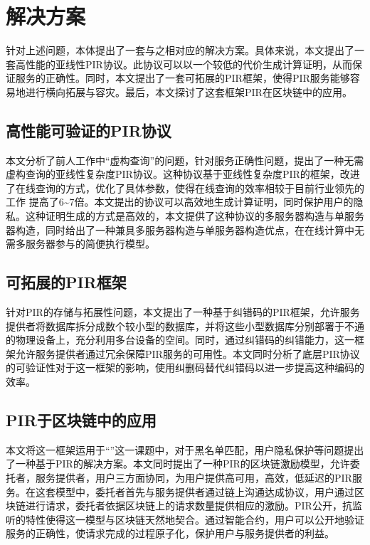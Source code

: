 \section{解决方案}
针对上述问题，本体提出了一套与之相对应的解决方案。具体来说，本文提出了一套高性能的亚线性PIR协议。此协议可以以一个较低的代价生成计算证明，从而保证服务的正确性。同时，本文提出了一套可拓展的PIR框架，使得PIR服务能够容易地进行横向拓展与容灾。最后，本文探讨了这套框架PIR在区块链中的应用。
\subsection{高性能可验证的PIR协议}
本文分析了前人工作中“虚构查询”的问题，针对服务正确性问题，提出了一种无需虚构查询的亚线性复杂度PIR协议。这种协议基于亚线性复杂度PIR的框架，改进了在线查询的方式，优化了具体参数，使得在线查询的效率相较于目前行业领先的工作 \cite{TreePIR,Piano} 提高了6\textasciitilde7倍。本文提出的协议可以高效地生成计算证明，同时保护用户的隐私。这种证明生成的方式是高效的，本文提供了这种协议的多服务器构造与单服务器构造，同时给出了一种兼具多服务器构造与单服务器构造优点，在在线计算中无需多服务器参与的简便执行模型。
\subsection{可拓展的PIR框架}
针对PIR的存储与拓展性问题，本文提出了一种基于纠错码的PIR框架，允许服务提供者将数据库拆分成数个较小型的数据库，并将这些小型数据库分别部署于不通的物理设备上，充分利用多台设备的空间。同时，通过纠错码的纠错能力，这一框架允许服务提供者通过冗余保障PIR服务的可用性。本文同时分析了底层PIR协议的可验证性对于这一框架的影响，使用纠删码替代纠错码以进一步提高这种编码的效率。

\subsection{PIR于区块链中的应用}
本文将这一框架运用于“\projectname”这一课题中，对于黑名单匹配，用户隐私保护等问题提出了一种基于PIR的解决方案。本文同时提出了一种PIR的区块链激励模型，允许委托者，服务提供者，用户三方面协同，为用户提供高可用，高效，低延迟的PIR服务。在这套模型中，委托者首先与服务提供者通过链上沟通达成协议，用户通过区块链进行请求，委托者依据区块链上的请求数量提供相应的激励。PIR公开，抗监听的特性使得这一模型与区块链天然地契合。通过智能合约，用户可以公开地验证服务的正确性，使请求完成的过程原子化，保护用户与服务提供者的利益。